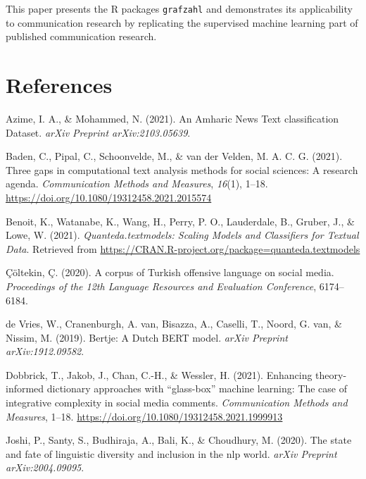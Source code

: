 \documentclass[
  english,
  man,floatsintext]{apa6}
\newlength{\cslhangindent}
\newenvironment{cslreferences}%
  {\setlength{\parindent}{0pt}%
  \everypar{\setlength{\hangindent}{\cslhangindent}}\ignorespaces}%
  {\par}
\begin{document}
This paper presents the R packages \texttt{grafzahl} and demonstrates its applicability to communication research by replicating the supervised machine learning part of published communication research.

\hypertarget{references}{%
\section{References}\label{references}}

\begingroup
\setlength{\parindent}{-0.5in}
\setlength{\leftskip}{0.5in}

\hypertarget{refs}{}
\begin{cslreferences}
\leavevmode\hypertarget{ref-azime2021amharic}{}%
Azime, I. A., \& Mohammed, N. (2021). An Amharic News Text classification Dataset. \emph{arXiv Preprint arXiv:2103.05639}.

\leavevmode\hypertarget{ref-baden:2021:TGC}{}%
Baden, C., Pipal, C., Schoonvelde, M., \& van der Velden, M. A. C. G. (2021). Three gaps in computational text analysis methods for social sciences: A research agenda. \emph{Communication Methods and Measures}, \emph{16}(1), 1--18. \url{https://doi.org/10.1080/19312458.2021.2015574}

\leavevmode\hypertarget{ref-quantedatextmodels}{}%
Benoit, K., Watanabe, K., Wang, H., Perry, P. O., Lauderdale, B., Gruber, J., \& Lowe, W. (2021). \emph{Quanteda.textmodels: Scaling Models and Classifiers for Textual Data}. Retrieved from \url{https://CRAN.R-project.org/package=quanteda.textmodels}

\leavevmode\hypertarget{ref-ccoltekin2020corpus}{}%
Çöltekin, Ç. (2020). A corpus of Turkish offensive language on social media. \emph{Proceedings of the 12th Language Resources and Evaluation Conference}, 6174--6184.

\leavevmode\hypertarget{ref-de2019bertje}{}%
de Vries, W., Cranenburgh, A. van, Bisazza, A., Caselli, T., Noord, G. van, \& Nissim, M. (2019). Bertje: A Dutch BERT model. \emph{arXiv Preprint arXiv:1912.09582}.

\leavevmode\hypertarget{ref-dobbrick:2021:ETI}{}%
Dobbrick, T., Jakob, J., Chan, C.-H., \& Wessler, H. (2021). Enhancing theory-informed dictionary approaches with ``glass-box'' machine learning: The case of integrative complexity in social media comments. \emph{Communication Methods and Measures}, 1--18. \url{https://doi.org/10.1080/19312458.2021.1999913}

\leavevmode\hypertarget{ref-joshi2020state}{}%
Joshi, P., Santy, S., Budhiraja, A., Bali, K., \& Choudhury, M. (2020). The state and fate of linguistic diversity and inclusion in the nlp world. \emph{arXiv Preprint arXiv:2004.09095}.


\end{cslreferences}
\end{document}
